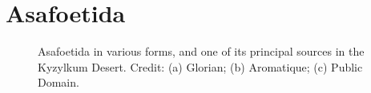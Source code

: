 


\section{Asafoetida}
\label{sec:asafoetida}



\begin{figure}[!ht]
	\vspace{-4ex}
	\centering
	\hfill
	\hfill
	\caption{Asafoetida in various forms, and one of its principal sources  in the Kyzylkum Desert. Credit: (a) Glorian; (b) Aromatique; (c) Public Domain.}
	\label{fig:asafoetida_imgs}
\end{figure}

